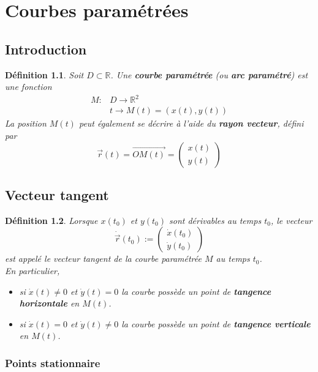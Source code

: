 \documentclass[10pt,a4paper]{book}
\newcommand{\R}{\mathbb{R}}
\newtheorem{definition}{Définition}[section]
\begin{document}
\chapter{Courbes paramétrées} %

\section{Introduction}

\begin{definition}
Soit $D \subset \R$. Une \textbf{courbe paramétrée} (ou \textbf{arc paramétré}) est une fonction
\begin{equation*}
\begin{split}
M: & D \rightarrow \R^2 \\
& t \rightarrow M(t) = (x(t), y(t))
\end{split}
\end{equation*}
La position $M(t)$ peut également se décrire à l'aide du \textbf{rayon vecteur}, défini par 
\[\vec{r}(t) = \vec{OM(t)} = \left( \begin{array}{c} x(t) \\ y(t) \end{array} \right)\]
\end{definition}

\section{Vecteur tangent}

\begin{definition}
Lorsque $x(t_0)$ et $y(t_0)$ sont dérivables au temps $t_0$, le vecteur 
\[\dot{\vec{r}}(t_0) := \left( \begin{array}{c} \dot{x}(t_0) \\ \dot{y}(t_0) \end{array} \right)\]
est appelé le vecteur tangent de la courbe paramétrée $M$ au temps $t_0$. \\
En particulier,
\begin{itemize}
\item si $\dot{x}(t) \neq 0$ et $\dot{y}(t) = 0$ la courbe possède un point de \textbf{tangence horizontale} en $M(t)$.
\item si $\dot{x}(t) = 0$ et $\dot{y}(t) \neq 0$ la courbe possède un point de \textbf{tangence verticale} en $M(t)$.
\end{itemize}
\end{definition}

\subsection{Points stationnaire}
\end{document}

